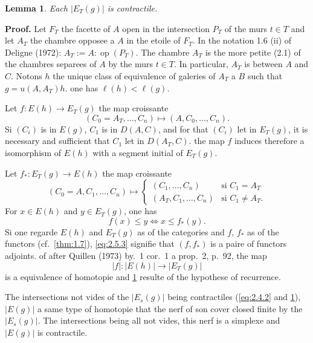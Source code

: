 \documentclass[11pt,a4paper]{article}
\theoremstyle{plain}
\newtheorem{lemma}[theorem]{Lemma}
\theoremstyle{definition}
\begin{document}
\begin{lemma}\label{lem:2.5}
Each $|E_T(g)|$ is contractile.
\end{lemma}

\noindent\textbf{Proof.} Let $F_T$ the facette of $A$ open in the intersection $P_T$ of the murs $t \in T$ and let $A_T$ the chambre opposee a $A$ in the etoile of $F_T$. In the notation 1.6 (ii) of Deligne (1972): $A_T := A : \operatorname{op}(P_T)$. The chambre $A_T$ is the more petite (2.1) of the chambres separees of $A$ by the murs $t \in T$. In particular, $A_T$ is between $A$ and $C$. Notons $h$ the unique class of equivalence of galeries of $A_T$ a $B$ such that $g = u(A, A_T) h$. one has $\ell(h) < \ell(g)$.

Let $f : E(h) \to E_T(g)$ the map croissante
\begin{equation}\label{eq:2.5.1}
(C_0 = A_T, \ldots, C_n) \mapsto (A, C_0, \ldots, C_n).
\tag{2.5.1}
\end{equation}
Si $(C_i)$ is in $E(g)$, $C_1$ is in $D(A,C)$, and for that $(C_i)$ let in $E_T(g)$, it is necessary and sufficient that $C_1$ let in $D(A_T, C)$. the map $f$ induces therefore a isomorphism of $E(h)$ with a segment initial of $E_T(g)$.

Let $f_* : E_T(g) \to E(h)$ the map croissante
\begin{equation}\label{eq:2.5.2}
(C_0 = A, C_1, \ldots, C_n) \mapsto \begin{cases} (C_1, \ldots, C_n) & \text{si } C_1 = A_T \\ (A_T, C_1, \ldots, C_n) & \text{si } C_1 \not= A_T. \end{cases}
\tag{2.5.2}
\end{equation}
For $x \in E(h)$ and $y \in E_T(g)$, one has
\begin{equation}\label{eq:2.5.3}
f(x) \leq y \iff x \leq f_*(y).
\tag{2.5.3}
\end{equation}
Si one regarde $E(h)$ and $E_T(g)$ as of the categories and $f$, $f_*$ as of the functors (cf.~\ref{thm:1.7}), \eqref{eq:2.5.3} signifie that $(f, f_*)$ is a paire of functors adjoints. of after Quillen (1973) by.~1 cor.~1 a prop.~2, p.~92, the map
\[
|f| : |E(h)| \to |E_T(g)|
\]
is a equivalence of homotopie and \ref{lem:2.5} resulte of the hypothese of recurrence.

The intersections not vides of the $|E_s(g)|$ being contractiles (\eqref{eq:2.4.2} and \ref{lem:2.5}), $|E(g)|$ a same type of homotopie that the nerf of son cover closed finite by the $|E_s(g)|$. The intersections being all not vides, this nerf is a simplexe and $|E(g)|$ is contractile.
\end{document}
